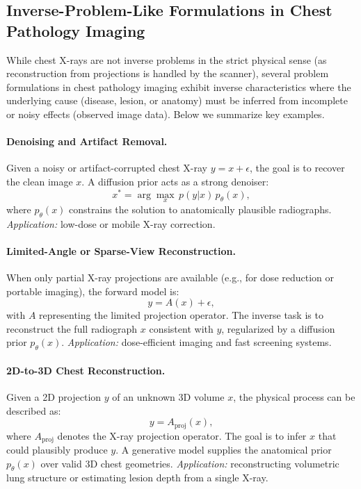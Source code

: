 \subsection{Inverse-Problem-Like Formulations in Chest Pathology Imaging}

While chest X-rays are not inverse problems in the strict physical sense (as reconstruction from projections is handled by the scanner), 
several problem formulations in chest pathology imaging exhibit inverse characteristics where 
the underlying cause (disease, lesion, or anatomy) must be inferred from incomplete or noisy effects (observed image data). 
Below we summarize key examples.

\paragraph{Denoising and Artifact Removal.}
Given a noisy or artifact-corrupted chest X-ray \( y = x + \epsilon \), 
the goal is to recover the clean image \( x \). 
A diffusion prior acts as a strong denoiser:
\[
x^* = \arg\max_x \, p(y|x)\,p_\theta(x),
\]
where \( p_\theta(x) \) constrains the solution to anatomically plausible radiographs. 
\textit{Application:} low-dose or mobile X-ray correction.

\paragraph{Limited-Angle or Sparse-View Reconstruction.}
When only partial X-ray projections are available (e.g., for dose reduction or portable imaging),
the forward model is:
\[
y = A(x) + \epsilon,
\]
with \( A \) representing the limited projection operator. 
The inverse task is to reconstruct the full radiograph \( x \) consistent with \( y \), 
regularized by a diffusion prior \( p_\theta(x) \). 
\textit{Application:} dose-efficient imaging and fast screening systems.

\paragraph{2D-to-3D Chest Reconstruction.}
Given a 2D projection \( y \) of an unknown 3D volume \( x \), 
the physical process can be described as:
\[
y = A_\text{proj}(x),
\]
where \( A_\text{proj} \) denotes the X-ray projection operator. 
The goal is to infer \( x \) that could plausibly produce \( y \). 
A generative model supplies the anatomical prior \( p_\theta(x) \) over valid 3D chest geometries. 
\textit{Application:} reconstructing volumetric lung structure or estimating lesion depth from a single X-ray.

